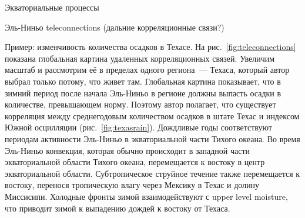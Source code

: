 \begin{chapter}{Экваториальные процессы}
\begin{section}{Эль-Ниньо teleconnections (дальние корреляционные связи?)}
\begin{paragraph}{Пример: изменчивость количества осадков в Техасе.}
На рис.~\ref{fig:teleconnections} показана глобальная картина удаленных 
корреляционных связей. Увеличим масштаб и рассмотрим её в пределах одного
региона~--- Техаса, который автор выбрал только потому, что живет
там. Глобальная картина показывает, что в зимний период после начала
Эль-Ниньо в регионе должны выпасть осадки в количестве, превышающем
норму. Поэтому автор полагает, что существует корреляция между среднегодовым
количеством осадков в штате Техас и индексом Южной осцилляции%
 (рис.~\ref{fig:texasrain}). 
Дождливые годы соответствуют периодам активности Эль-Ниньо в
экваториальной части Тихого океана. Во время Эль-Ниньо конвекция,
которая обычно происходит в западной части экваториальной области Тихого океана,
перемещается к востоку в центр экваториальной области.
Субтропическое струйное течение также перемещается к востоку, перенося
тропическую влагу через Мексику в Техас и долину
Миссисипи. Холодные фронты зимой взаимодействуют с upper level moisture, 
что приводит зимой к выпадению дождей к востоку от Техаса.
%


\end{paragraph}
\end{section}
\end{chapter}
